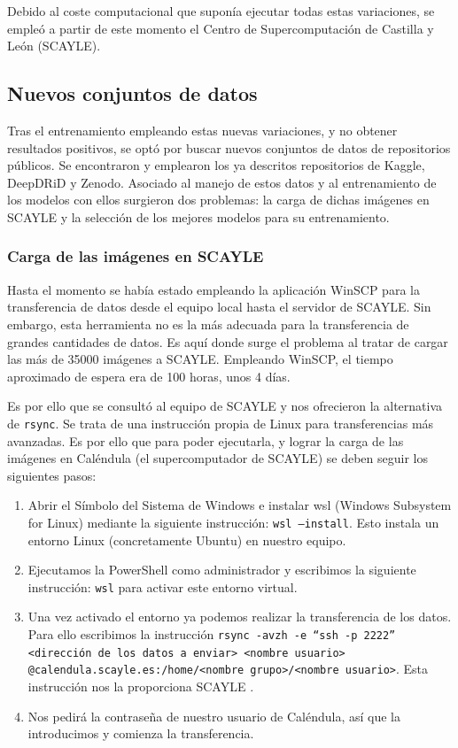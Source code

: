 Debido al coste computacional que suponía ejecutar todas estas variaciones, se empleó a partir de este momento el Centro de Supercomputación de Castilla y León (SCAYLE).

\subsection{Nuevos conjuntos de datos}

Tras el entrenamiento empleando estas nuevas variaciones, y no obtener resultados positivos, se optó por buscar nuevos conjuntos de datos de repositorios públicos. Se encontraron y emplearon los ya descritos repositorios de Kaggle, DeepDRiD y Zenodo. Asociado al manejo de estos datos y al entrenamiento de los modelos con ellos surgieron dos problemas: la carga de dichas imágenes en SCAYLE y la selección de los mejores modelos para su entrenamiento.

\subsubsection{Carga de las imágenes en SCAYLE}

Hasta el momento se había estado empleando la aplicación WinSCP para la transferencia de datos desde el equipo local hasta el servidor de SCAYLE. Sin embargo, esta herramienta no es la más adecuada para la transferencia de grandes cantidades de datos. Es aquí donde surge el problema al tratar de cargar las más de 35000 imágenes a SCAYLE. Empleando WinSCP, el tiempo aproximado de espera era de 100 horas, unos 4 días.

Es por ello que se consultó al equipo de SCAYLE y nos ofrecieron la alternativa de \texttt{rsync}. Se trata de una instrucción propia de Linux para transferencias más avanzadas. Es por ello que para poder ejecutarla, y lograr la carga de las imágenes en Caléndula (el supercomputador de SCAYLE) se deben seguir los siguientes pasos:

\begin{enumerate}
    \item Abrir el Símbolo del Sistema de Windows e instalar wsl (Windows Subsystem for Linux) mediante la siguiente instrucción: \texttt{wsl --install}. Esto instala un entorno Linux (concretamente Ubuntu) en nuestro equipo.
    \item Ejecutamos la PowerShell como administrador y escribimos la siguiente instrucción: \texttt{wsl} para activar este entorno virtual.
    \item Una vez activado el entorno ya podemos realizar la transferencia de los datos. Para ello escribimos la instrucción \texttt{rsync -avzh -e ``ssh -p 2222'' <dirección de los datos a enviar> <nombre usuario>\\@calendula.scayle.es:/home/<nombre grupo>/<nombre usuario>}. Esta instrucción nos la proporciona SCAYLE \cite{rsync}.
    \item Nos pedirá la contraseña de nuestro usuario de Caléndula, así que la introducimos y comienza la transferencia.
\end{enumerate}

